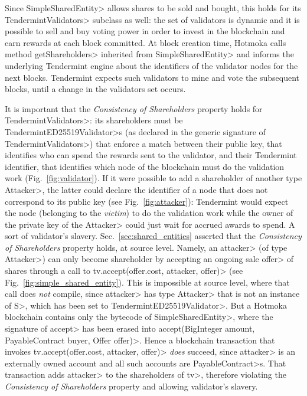 Since \<SimpleSharedEntity> allows shares to be sold and bought, this holds for
its \<TendermintValidators> subclass as well: the set of validators
is dynamic and it is possible to sell and buy voting power in order to invest in the blockchain
and earn rewards at each block committed. At block creation time,
Hotmoka calls method \<getShareholders> inherited from
\<SimpleSharedEntity> and informs the
underlying Tendermint engine about the identifiers of the validator nodes for the next blocks.
Tendermint expects such validators to mine and vote the subsequent blocks, until a change in the
validators set occurs.

It is important that the \emph{Consistency of Shareholders} property holds
for \<TendermintValidators>: its shareholders
must be \<TendermintED25519Validator>s (as declared in the generic
signature of \<TendermintValidators>) that enforce a
match between their public key, that identifies who can spend the rewards sent to the validator,
and their Tendermint identifier, that identifies which node of the blockchain
must do the validation work (Fig.~\ref{fig:validator}).
If it were possible to add a shareholder of another
type \<Attacker>, the latter could declare the identifier of a node that does not correspond to its
public key (see Fig.~\ref{fig:attacker}):
Tendermint would expect the node (belonging to the \emph{victim}) to do
the validation work while the owner
of the private key of the \<Attacker> could just wait for accrued awards to spend.
A sort of validator's slavery.
Sec.~\ref{sec:shared_entities} asserted that the \emph{Consistency of Shareholders}
property holds, at source level.
Namely, an \<attacker> (of type \<Attacker>) can only become shareholder
by accepting an ongoing sale \<offer> of shares through a call to
\<tv.accept(offer.cost, attacker, offer)> (see Fig.~\ref{fig:simple_shared_entity}).
This is impossible at source level, where that call does \emph{not} compile, since \<attacker> has type \<Attacker> that
is not an instance of \<S>, which has been set to \<TendermintED25519Validator>.
But a Hotmoka blockchain contains only the bytecode of \<SimpleSharedEntity>,
where the signature of \<accept> has been erased into
\<accept(BigInteger amount, PayableContract buyer, Offer offer)>.
Hence a blockchain transaction that invokes \<tv.accept(offer.cost, attacker, offer)>
\emph{does} succeed, since \<attacker> is an externally owned account and all such accounts
are \<PayableContract>s.
That transaction adds \<attacker> to the shareholders of \<tv>,
therefore violating the \emph{Consistency of Shareholders} property and allowing
validator's slavery.

